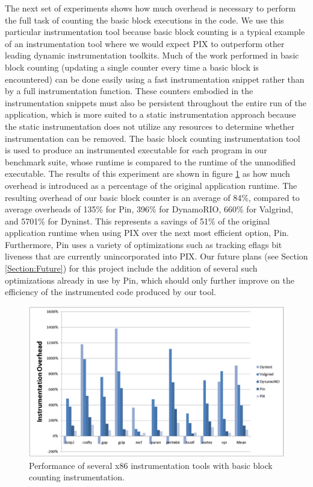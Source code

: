 The next set of experiments shows how much overhead is necessary to perform the full task of counting the
basic block executions in the code. We use this particular instrumentation tool because basic block counting
is a typical example of an instrumentation tool where we would expect PIX to outperform other leading
dynamic instrumentation toolkits. Much of the work performed in basic block counting (updating a single
counter every time a basic block is encountered) can be done easily using a fast instrumentation snippet rather than
by a full instrumentation function. These counters embodied in the instrumentation snippets must also be
persistent throughout the entire run of the application, which is more suited to a static instrumentation approach
because the static instrumentation does not utilize any resources to determine whether instrumentation can be removed.
The basic block counting instrumentation tool is used to produce an instrumented
executable for each program in our benchmark suite, whose runtime is compared to the runtime of the 
unmodified executable. The results of this experiment are shown in figure \ref{Figure:ToolOverheads} as
how much overhead is introduced as a percentage of the original application runtime. The
resulting overhead of our basic block counter is an average of 84\%, compared to average overheads of
135\% for Pin, 396\% for DynamoRIO, 660\% for Valgrind, and 5701\% for Dyninst. This represents a savings of
51\% of the original application runtime when using PIX over the next most efficient option, Pin. Furthermore,
Pin uses a variety of optimizations such as tracking eflags bit liveness \cite{luk2005pin} that are currently
unincorporated into PIX. Our future plans (see Section \ref{Section:Future}) for this project include the addition of several
such optimizations already in use by Pin, which should only further improve on the efficiency of the instrumented
code produced by our tool.

\begin{figure}[ht]
\centering
\label{Figure:ToolOverheads}
\includegraphics[scale=0.5]{bbcount.eps}
\caption{Performance of several x86 instrumentation tools with basic block counting instrumentation.}
\end{figure}